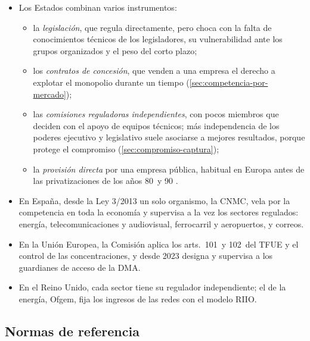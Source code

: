 \documentclass[11pt]{article}
\begin{document}
\begin{itemize}
\item Los Estados combinan varios instrumentos:
  \begin{itemize}
  \item la \emph{legislación}, que regula directamente, pero choca con la falta de conocimientos técnicos de los legisladores, su vulnerabilidad ante los grupos organizados y el peso del corto plazo;
  \item los \emph{contratos de concesión}, que venden a una empresa el derecho a explotar el monopolio durante un tiempo (\ref{sec:competencia-por-mercado});
  \item las \emph{comisiones reguladoras independientes}, con pocos miembros que deciden con el apoyo de equipos técnicos; más independencia de los poderes ejecutivo y legislativo suele asociarse a mejores resultados, porque protege el compromiso (\ref{sec:compromiso-captura});
  \item la \emph{provisión directa} por una empresa pública, habitual en Europa antes de las privatizaciones de los años 80~y 90 .
  \end{itemize}
\item En España, desde la Ley 3/2013 un solo organismo, la CNMC, vela por la competencia en toda la economía y supervisa a la vez los sectores regulados: energía, telecomunicaciones y audiovisual, ferrocarril y aeropuertos, y correos\nocite{Ley3_2013CNMC}.
\item En la Unión Europea, la Comisión aplica los arts.~101~y 102~del TFUE y el control de las concentraciones\nocite{UE2016TFUE,UE2004Reglamento139}, y desde 2023 designa y supervisa a los guardianes de acceso de la DMA\nocite{UE2022DMA}.
\item En el Reino Unido, cada sector tiene su regulador independiente; el de la energía, Ofgem, fija los ingresos de las redes con el modelo RIIO\nocite{Ofgem2025RIIO3ET}.
\end{itemize}

\subsection{Normas de referencia}\label{anexo:normas}
\end{document}
